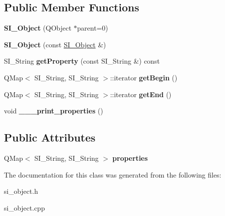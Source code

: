 \subsection*{Public Member Functions}
\begin{DoxyCompactItemize}
\item 
\mbox{\label{class_s_i___object_a6ec637849a43d4d6eb9cd41f649cc1ec}} 
{\bfseries S\+I\+\_\+\+Object} (Q\+Object $\ast$parent=0)
\item 
\mbox{\label{class_s_i___object_a9ec2d414baa9b92d0fd6a3404f2ee2d7}} 
{\bfseries S\+I\+\_\+\+Object} (const \hyperlink{class_s_i___object}{S\+I\+\_\+\+Object} \&)
\item 
\mbox{\label{class_s_i___object_a68431e1d8f5383b8519cf5a451737cb8}} 
S\+I\+\_\+\+String {\bfseries get\+Property} (const S\+I\+\_\+\+String \&) const
\item 
\mbox{\label{class_s_i___object_af617bfe0cbc89aa2a62ceeb2b34233d3}} 
Q\+Map$<$ S\+I\+\_\+\+String, S\+I\+\_\+\+String $>$\+::iterator {\bfseries get\+Begin} ()
\item 
\mbox{\label{class_s_i___object_ac2a9abad4b05bfc1800a915bcbe63025}} 
Q\+Map$<$ S\+I\+\_\+\+String, S\+I\+\_\+\+String $>$\+::iterator {\bfseries get\+End} ()
\item 
\mbox{\label{class_s_i___object_a2464e6bfc480a09dca8ad7d610660f90}} 
void {\bfseries \+\_\+\+\_\+\+\_\+print\+\_\+properties} ()
\end{DoxyCompactItemize}
\subsection*{Public Attributes}
\begin{DoxyCompactItemize}
\item 
\mbox{\label{class_s_i___object_a32f0018fcbae8593d45f84cf06f33f8e}} 
Q\+Map$<$ S\+I\+\_\+\+String, S\+I\+\_\+\+String $>$ {\bfseries properties}
\end{DoxyCompactItemize}


The documentation for this class was generated from the following files\+:\begin{DoxyCompactItemize}
\item 
si\+\_\+object.\+h\item 
si\+\_\+object.\+cpp\end{DoxyCompactItemize}
